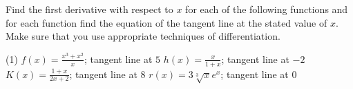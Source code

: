 \documentclass[10pt,oneside,]{book}
\theoremstyle{plain}
\theoremstyle{definition}
\numberwithin{equation}{section}
\newcommand{\fe}[2]{#1\mathopen{}\left(#2\right)\mathclose{}}
\begin{document}
\par\smallskip\noindent
Find the first derivative with respect to \(x\) for each of the following functions and for each function find the equation of the tangent line at the stated value of \(x\).  Make sure that you use appropriate techniques of differentiation.%
\par
\begin{exercisegroup}(1)
\exercise[21.]\hypertarget{exercise-421}{\null}\(\fe{f}{x}=\frac{x^3+x^2}{x}\); tangent line at \(5\)%
\exercise[22.]\hypertarget{exercise-422}{\null}\(\fe{h}{x}=\frac{x}{1+x}\); tangent line at \(-2\)%
\exercise[23.]\hypertarget{exercise-423}{\null}\(\fe{K}{x}=\frac{1+x}{2x+2}\); tangent line at \(8\)%
\exercise[24.]\hypertarget{exercise-424}{\null}\(\fe{r}{x}=3\sqrt[3]{x}e^x\); tangent line at \(0\)%
\end{exercisegroup}
\par\smallskip\noindent
\end{document}
